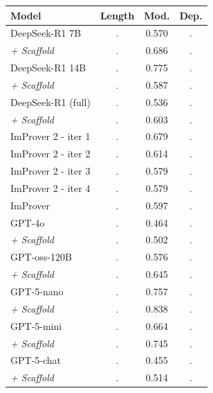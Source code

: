 \begin{tabular}{l|ccc}
\hline
\textbf{Model}  & \textbf{Length} & \textbf{Mod.} & \textbf{Dep.} \\
\hline
DeepSeek-R1 7B & . & 0.570 & . \\
\textit{+ Scaffold} & . & 0.686 & . \\
DeepSeek-R1 14B & . & 0.775 & . \\
\textit{+ Scaffold} & . & 0.587 & . \\
DeepSeek-R1 (full) & . & 0.536 & . \\
\textit{+ Scaffold} & . & 0.603 & . \\
\hdashline
ImProver 2 - iter 1 & . & 0.679 & . \\
ImProver 2 - iter 2 & . & 0.614 & . \\
ImProver 2 - iter 3 & . & 0.579 & . \\
ImProver 2 - iter 4 & . & 0.579 & . \\
\hdashline
ImProver & . & 0.597 & . \\
GPT-4o & . & 0.464 & . \\
\textit{+ Scaffold} & . & 0.502 & . \\
\hdashline
GPT-oss-120B & . & 0.576 & . \\
\textit{+ Scaffold} & . & 0.645 & . \\
GPT-5-nano & . & 0.757 & . \\
\textit{+ Scaffold} & . & 0.838 & . \\
GPT-5-mini & . & 0.664 & . \\
\textit{+ Scaffold} & . & 0.745 & . \\
GPT-5-chat & . & 0.455 & . \\
\textit{+ Scaffold} & . & 0.514 & . \\
\hline
\end{tabular}